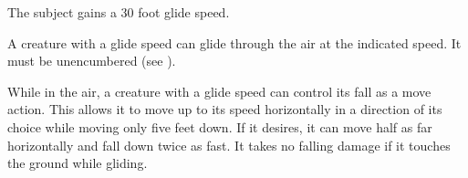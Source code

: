 \spellrng{\rngmed}
\spelldur{\durlong}
\begin{spelleffect}
  The subject gains a 30 foot glide speed.
\end{spelleffect}
\begin{spellnotes}
    A creature with a glide speed can glide through the air at the indicated speed. It must be unencumbered (see ).

    While in the air, a creature with a glide speed can control its fall as a move action. This allows it to move up to its speed horizontally in a direction of its choice while moving only five feet down. If it desires, it can move half as far horizontally and fall down twice as fast. It takes no falling damage if it touches the ground while gliding.
\end{spellnotes}

\begin{comment}
\spellsection{Ghoul Touch}
\spellschool{Necromancy (Flesh)}
\spelllvl{Sor/Wiz 3}
\spellrng{\rngtouch}
\spelltgt{Living creature touched}
\spelldur{\durshort}
\spellsave{None/Fortitude negates}
\spellsr{Yes (Fortitude)}
\begin{spelleffect}
  The subject is sickened, making it vulnerable.
\end{spelleffect}
\begin{spellblood}
  In addition, the subject is paralyzed if it fails a Fortitude save. Each round that it is paralyzed, the subject can make a new saving throw. If it succeeds, it is no longer paralyzed by the spell, though it is still sickened. In addition, as long as it is paralyzed, the subject exudes a carrion stench that causes all living creatures (except you) in a \areasmall radius spread to become sickened (Fortitude negates) for 5 rounds.
\end{spellblood}
\begin{spellnotes}
  A vulnerable creature takes a \minus2 penalty to attack rolls, saving throws, checks, DCs, and AC.
\end{spellnotes}
\end{comment}

